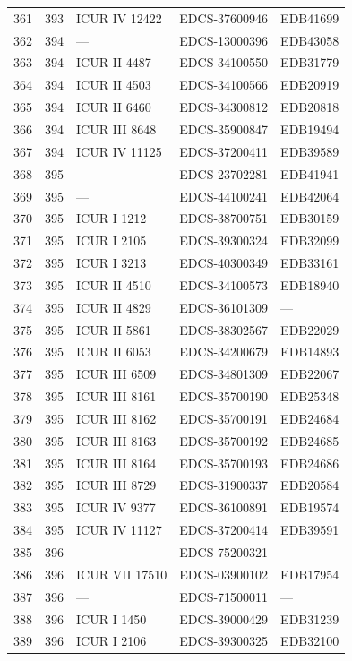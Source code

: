\begin{longtable}{@{}r r l l l@{}}
361 & 393 & ICUR IV 12422 & EDCS-37600946 & EDB41699 \\
362 & 394 & — & EDCS-13000396 & EDB43058 \\
363 & 394 & ICUR II 4487 & EDCS-34100550 & EDB31779 \\
364 & 394 & ICUR II 4503 & EDCS-34100566 & EDB20919 \\
365 & 394 & ICUR II 6460 & EDCS-34300812 & EDB20818 \\
366 & 394 & ICUR III 8648 & EDCS-35900847 & EDB19494 \\
367 & 394 & ICUR IV 11125 & EDCS-37200411 & EDB39589 \\
368 & 395 & — & EDCS-23702281 & EDB41941 \\
369 & 395 & — & EDCS-44100241 & EDB42064 \\
370 & 395 & ICUR I 1212 & EDCS-38700751 & EDB30159 \\
371 & 395 & ICUR I 2105 & EDCS-39300324 & EDB32099 \\
372 & 395 & ICUR I 3213 & EDCS-40300349 & EDB33161 \\
373 & 395 & ICUR II 4510 & EDCS-34100573 & EDB18940 \\
374 & 395 & ICUR II 4829 & EDCS-36101309 & — \\
375 & 395 & ICUR II 5861 & EDCS-38302567 & EDB22029 \\
376 & 395 & ICUR II 6053 & EDCS-34200679 & EDB14893 \\
377 & 395 & ICUR III 6509 & EDCS-34801309 & EDB22067 \\
378 & 395 & ICUR III 8161 & EDCS-35700190 & EDB25348 \\
379 & 395 & ICUR III 8162 & EDCS-35700191 & EDB24684 \\
380 & 395 & ICUR III 8163 & EDCS-35700192 & EDB24685 \\
381 & 395 & ICUR III 8164 & EDCS-35700193 & EDB24686 \\
382 & 395 & ICUR III 8729 & EDCS-31900337 & EDB20584 \\
383 & 395 & ICUR IV 9377 & EDCS-36100891 & EDB19574 \\
384 & 395 & ICUR IV 11127 & EDCS-37200414 & EDB39591 \\
385 & 396 & — & EDCS-75200321 & — \\
386 & 396 & ICUR VII 17510 & EDCS-03900102 & EDB17954 \\
387 & 396 & — & EDCS-71500011 & — \\
388 & 396 & ICUR I 1450 & EDCS-39000429 & EDB31239 \\
389 & 396 & ICUR I 2106 & EDCS-39300325 & EDB32100 \\

\end{longtable}
